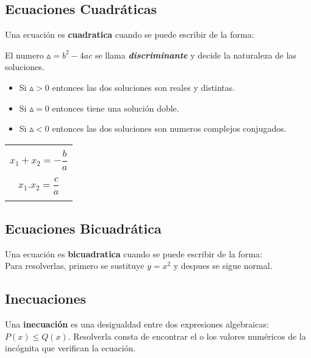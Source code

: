 \documentclass[10pt]{article}
\begin{document}
\subsection{Ecuaciones Cuadráticas}
Una ecuación es \textbf{cuadratica} cuando se puede escribir de la forma: \hfill {}\\
\begin{center}
\end{center}
El numero $\vartriangle = b^2-4ac$ se llama \textbf{\textit{discriminante}} y decide la naturaleza de las soluciones.
\begin{itemize}
\item Si $\vartriangle > 0$ entonces las dos soluciones son reales y distintas.\\
\item Si $\vartriangle = 0$ entonces tiene una solución doble.\\
\item Si $\vartriangle < 0$ entonces las dos soluciones son numeros complejos conjugados.
\end{itemize}
\begin{table}[h]
\begin{center}
\begin{tabular}{|c|}
\hline
\\
$x_1+x_2 = -\dfrac{b}{a}$\\
\\
$x_1.x_2 = \dfrac{c}{a}$\\
\\
\hline
\end{tabular}
\end{center}
\end{table}
\subsection{Ecuaciones Bicuadrática}
Una ecuación es \textbf{bicuadratica} cuando se puede escribir de la forma: \hfill {}\\
Para resolverlas, primero se sustituye $y=x^2$ y despues se sigue normal.
\subsection{Inecuaciones}
Una \textbf{inecuación} es una desigualdad entre dos expresiones algebraicas: $P(x) \leq Q(x)$. Resolverla consta de encontrar el o los valores numéricos de la incógnita que verifican la ecuación.
\end{document}
